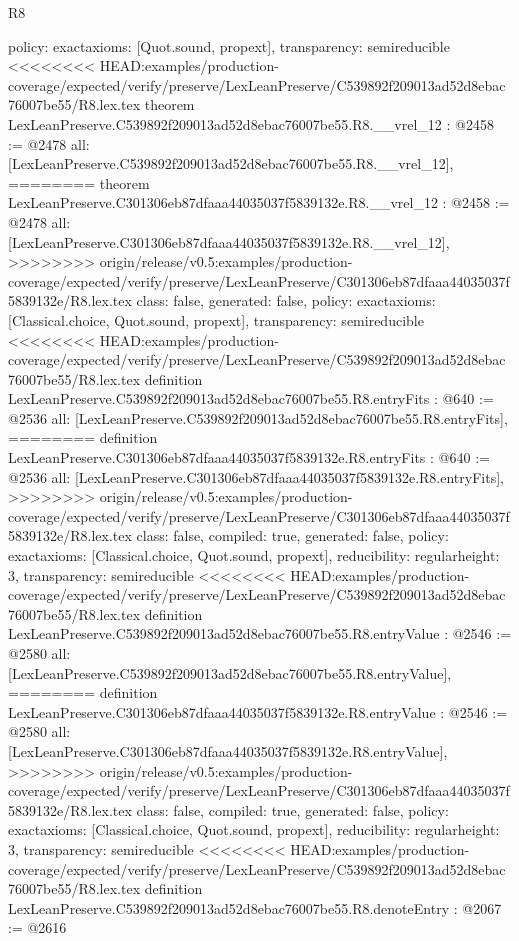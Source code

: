 \begin{lexlean}{R8}
\begin{coremodule}
{{{{{{{{{{{{{{{{{{{{{{{{{{{{{{{{{  policy: exact{axioms: [Quot.sound, propext]},
  transparency: semireducible
}
<<<<<<<< HEAD:examples/production-coverage/expected/verify/preserve/LexLeanPreserve/C539892f209013ad52d8ebac76007be55/R8.lex.tex
theorem LexLeanPreserve.C539892f209013ad52d8ebac76007be55.R8.__vrel_12 : @2458 := @2478 {
  all: [LexLeanPreserve.C539892f209013ad52d8ebac76007be55.R8.__vrel_12],
========
theorem LexLeanPreserve.C301306eb87dfaaa44035037f5839132e.R8.__vrel_12 : @2458 := @2478 {
  all: [LexLeanPreserve.C301306eb87dfaaa44035037f5839132e.R8.__vrel_12],
>>>>>>>> origin/release/v0.5:examples/production-coverage/expected/verify/preserve/LexLeanPreserve/C301306eb87dfaaa44035037f5839132e/R8.lex.tex
  class: false,
  generated: false,
  policy: exact{axioms: [Classical.choice, Quot.sound, propext]},
  transparency: semireducible
}
<<<<<<<< HEAD:examples/production-coverage/expected/verify/preserve/LexLeanPreserve/C539892f209013ad52d8ebac76007be55/R8.lex.tex
definition LexLeanPreserve.C539892f209013ad52d8ebac76007be55.R8.entryFits : @640 := @2536 {
  all: [LexLeanPreserve.C539892f209013ad52d8ebac76007be55.R8.entryFits],
========
definition LexLeanPreserve.C301306eb87dfaaa44035037f5839132e.R8.entryFits : @640 := @2536 {
  all: [LexLeanPreserve.C301306eb87dfaaa44035037f5839132e.R8.entryFits],
>>>>>>>> origin/release/v0.5:examples/production-coverage/expected/verify/preserve/LexLeanPreserve/C301306eb87dfaaa44035037f5839132e/R8.lex.tex
  class: false,
  compiled: true,
  generated: false,
  policy: exact{axioms: [Classical.choice, Quot.sound, propext]},
  reducibility: regular{height: 3},
  transparency: semireducible
}
<<<<<<<< HEAD:examples/production-coverage/expected/verify/preserve/LexLeanPreserve/C539892f209013ad52d8ebac76007be55/R8.lex.tex
definition LexLeanPreserve.C539892f209013ad52d8ebac76007be55.R8.entryValue : @2546 := @2580 {
  all: [LexLeanPreserve.C539892f209013ad52d8ebac76007be55.R8.entryValue],
========
definition LexLeanPreserve.C301306eb87dfaaa44035037f5839132e.R8.entryValue : @2546 := @2580 {
  all: [LexLeanPreserve.C301306eb87dfaaa44035037f5839132e.R8.entryValue],
>>>>>>>> origin/release/v0.5:examples/production-coverage/expected/verify/preserve/LexLeanPreserve/C301306eb87dfaaa44035037f5839132e/R8.lex.tex
  class: false,
  compiled: true,
  generated: false,
  policy: exact{axioms: [Classical.choice, Quot.sound, propext]},
  reducibility: regular{height: 3},
  transparency: semireducible
}
<<<<<<<< HEAD:examples/production-coverage/expected/verify/preserve/LexLeanPreserve/C539892f209013ad52d8ebac76007be55/R8.lex.tex
definition LexLeanPreserve.C539892f209013ad52d8ebac76007be55.R8.denoteEntry : @2067 := @2616 {
}}}}}}}}}}}}}}}}}}}}}}}}}}}}}}}}}}}}
\end{coremodule}
\end{lexlean}
